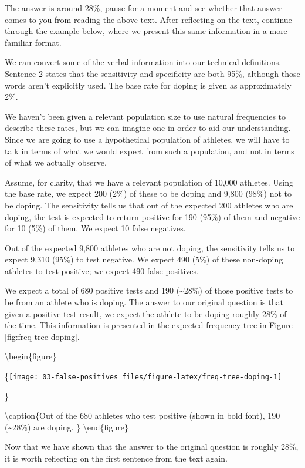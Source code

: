 \documentclass[
]{book}
\begin{document}
The answer is around 28\%, pause for a moment and see whether that answer comes to you from reading the above text. After reflecting on the text, continue through the example below, where we present this same information in a more familiar format.

We can convert some of the verbal information into our technical definitions. Sentence 2 states that the sensitivity and specificity are both 95\%, although those words aren't explicitly used. The base rate for doping is given as approximately 2\%.

We haven't been given a relevant population size to use natural frequencies to describe these rates, but we can imagine one in order to aid our understanding. Since we are going to use a hypothetical population of athletes, we will have to talk in terms of what we would expect from such a population, and not in terms of what we actually observe.

Assume, for clarity, that we have a relevant population of 10,000 athletes. Using the base rate, we expect 200 (2\%) of these to be doping and 9,800 (98\%) not to be doping. The sensitivity tells us that out of the expected 200 athletes who are doping, the test is expected to return positive for 190 (95\%) of them and negative for 10 (5\%) of them. We expect 10 false negatives.

Out of the expected 9,800 athletes who are not doping, the sensitivity tells us to expect 9,310 (95\%) to test negative. We expect 490 (5\%) of these non-doping athletes to test positive; we expect 490 false positives.

We expect a total of 680 positive tests and 190 (\textasciitilde28\%) of those positive tests to be from an athlete who is doping. The answer to our original question is that given a positive test result, we expect the athlete to be doping roughly 28\% of the time. This information is presented in the expected frequency tree in Figure \ref{fig:freq-tree-doping}.

\textbackslash begin\{figure\}

\{\centering \texttt{[image: 03-false-positives\_files/figure-latex/freq-tree-doping-1]}

\}

\textbackslash caption\{Out of the 680 athletes who test positive (shown in bold font), 190 (\textasciitilde28\%) are doping. \}\label{fig:freq-tree-doping}
\textbackslash end\{figure\}

Now that we have shown that the answer to the original question is roughly 28\%, it is worth reflecting on the first sentence from the text again.
\end{document}
